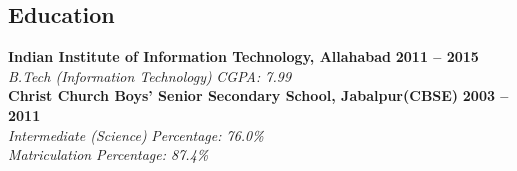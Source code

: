 \documentclass[margin,line]{resume}
\newcounter{dateone}
\newcounter{datetwo}
\newcommand{\difftoday}[3]{%
      \setmydatenumber{dateone}{\the\year}{\the\month}{\the\day}%
      \setmydatenumber{datetwo}{#1}{#2}{#3}%
      \addtocounter{datetwo}{-\thedateone}%
      \the\numexpr-\thedatetwo/365\relax\space year(s),
      \the\numexpr(-\thedatetwo - (-\thedatetwo/365)*365)/30\relax\space month(s)
}
\begin{document}
  \address{mobile: +91-8826567807 \\ email: hp.iiita@gmail.com}
\begin{resume}


    \section{\mysidestyle Education}

    \textbf{Indian Institute of Information Technology, Allahabad} \hfill \textbf{2011 -- 2015}\vspace{0mm}\\\vspace{0mm}%
    \textsl{B.Tech (Information Technology)} \hfill \textsl{CGPA: 7.99}\vspace{2mm}\\
    \textbf{Christ Church Boys' Senior Secondary School, Jabalpur(CBSE)} \hfill \textbf{2003 -- 2011}\vspace{0mm}\\\vspace{0mm}%
    \textsl{Intermediate (Science)} \hfill \textsl{Percentage: 76.0\%}\vspace{0mm}\\\vspace{0mm}%
    \textsl{Matriculation } \hfill \textsl{Percentage: 87.4\%}


\end{resume}
\end{document}
